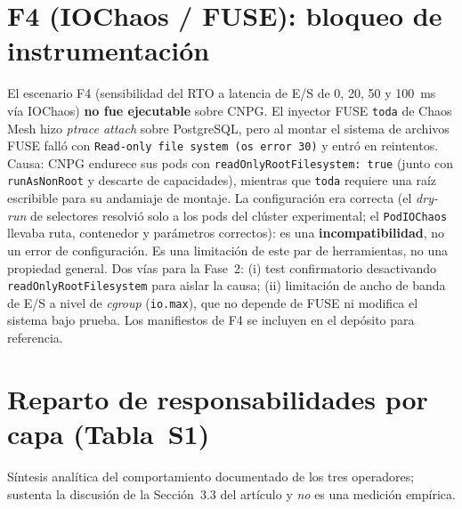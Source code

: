 \documentclass[11pt,letterpaper]{article}
\begin{document}
\section{F4 (IOChaos / FUSE): bloqueo de instrumentación}
El escenario F4 (sensibilidad del RTO a latencia de E/S de 0, 20, 50 y 100~ms vía IOChaos) \textbf{no fue ejecutable} sobre CNPG. El inyector FUSE \texttt{toda} de Chaos Mesh hizo \emph{ptrace attach} sobre PostgreSQL, pero al montar el sistema de archivos FUSE falló con \texttt{Read-only file system (os error 30)} y entró en reintentos. Causa: CNPG endurece sus pods con \texttt{readOnlyRootFilesystem: true} (junto con \texttt{runAsNonRoot} y descarte de capacidades), mientras que \texttt{toda} requiere una raíz escribible para su andamiaje de montaje. La configuración era correcta (el \emph{dry-run} de selectores resolvió solo a los pods del clúster experimental; el \texttt{PodIOChaos} llevaba ruta, contenedor y parámetros correctos): es una \textbf{incompatibilidad}, no un error de configuración. Es una limitación de este par de herramientas, no una propiedad general. Dos vías para la Fase~2: (i) test confirmatorio desactivando \texttt{readOnlyRootFilesystem} para aislar la causa; (ii) limitación de ancho de banda de E/S a nivel de \emph{cgroup} (\texttt{io.max}), que no depende de FUSE ni modifica el sistema bajo prueba. Los manifiestos de F4 se incluyen en el depósito para referencia.

\section{Reparto de responsabilidades por capa (Tabla~S1)}
Síntesis analítica del comportamiento documentado de los tres operadores; sustenta la discusión de la Sección~3.3 del artículo y \emph{no} es una medición empírica.
\end{document}
